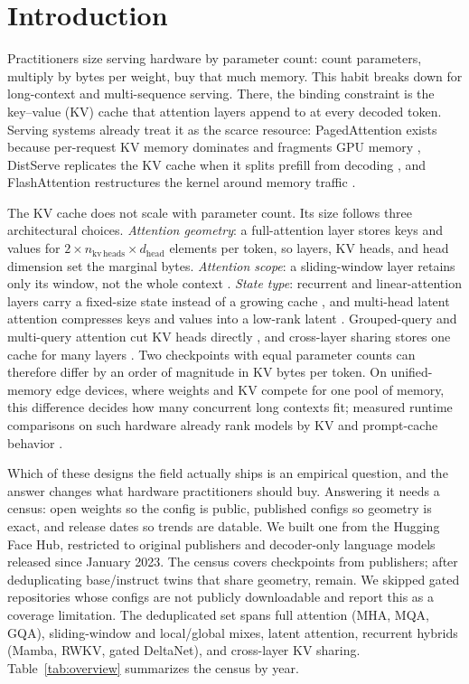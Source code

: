 \section{Introduction}
\label{sec:intro}

Practitioners size serving hardware by parameter count: count parameters,
multiply by bytes per weight, buy that much memory. This habit breaks down for
long-context and multi-sequence serving. There, the
binding constraint is the key--value (KV) cache that attention layers append to
at every decoded token. Serving systems already treat it as the scarce
resource: PagedAttention exists because per-request KV memory dominates and
fragments GPU memory \cite{kwon2023paged}, DistServe replicates the KV cache
when it splits prefill from decoding \cite{zhong2024distserve}, and
FlashAttention restructures the kernel around memory traffic \cite{dao2022flashattention}.

The KV cache does not scale with parameter count. Its size follows three
architectural choices. \emph{Attention geometry}: a full-attention layer stores
keys and values for $2 \times n_{\mathrm{kv\,heads}} \times d_{\mathrm{head}}$
elements per token, so layers, KV heads, and head dimension set the marginal
bytes. \emph{Attention scope}: a sliding-window layer retains only its window,
not the whole context \cite{jiang2023mistral}. \emph{State type}: recurrent and
linear-attention layers carry a fixed-size state instead of a growing cache
\cite{gu2023mamba,katharopoulos2020linear}, and multi-head latent attention
compresses keys and values into a low-rank latent \cite{deepseekai2024v2}.
Grouped-query and multi-query attention cut KV heads directly
\cite{shazeer2019mqa,ainslie2023gqa}, and cross-layer sharing stores one cache
for many layers \cite{sun2024yoco}. Two checkpoints with equal parameter counts
can therefore differ by an order of magnitude in KV bytes per token. On
unified-memory edge devices, where weights and KV compete for one pool of
memory, this difference decides how many concurrent long contexts fit; measured
runtime comparisons on such hardware already rank models by KV and prompt-cache
behavior \cite{rajesh2025edgemem}.

Which of these designs the field actually ships is an empirical question, and
the answer changes what hardware practitioners should buy. Answering it needs a
census: open weights so the config is public, published configs so geometry is
exact, and release dates so trends are datable. We built one from the Hugging
Face Hub, restricted to original publishers and decoder-only language models
released since January 2023. The census covers \kvcCensusRows{} checkpoints from
\kvcOrgCount{} publishers; after deduplicating base/instruct twins that share
geometry, \kvcDedupRows{} remain. We skipped \kvcGatedSkipped{} gated
repositories whose configs are not publicly downloadable and report this as a
coverage limitation. The deduplicated set spans full attention (MHA, MQA, GQA),
sliding-window and local/global mixes, latent attention, recurrent hybrids
(Mamba, RWKV, gated DeltaNet), and cross-layer KV sharing. Table~\ref{tab:overview}
summarizes the census by year.

